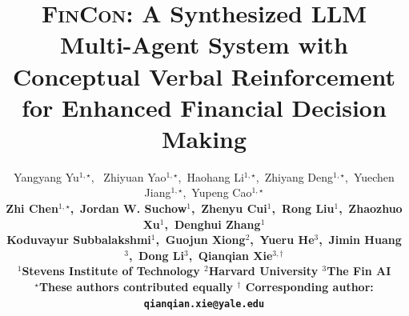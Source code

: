 \documentclass{article}
\title{\textsc{FinCon}: A Synthesized LLM Multi-Agent System with Conceptual Verbal Reinforcement for Enhanced Financial Decision Making}
\author{
\hspace{-1cm}
Yangyang Yu$^{1,\star}$, \, 
Zhiyuan Yao$^{1,\star}$,\,
Haohang Li$^{1,\star}$,\,
Zhiyang Deng$^{1,\star}$,\,
Yuechen Jiang$^{1,\star}$,\,
Yupeng Cao$^{1,\star}$\\
\bf
\hspace{-1cm}
Zhi Chen$^{1, \star}$,\,
Jordan W. Suchow$^{1}$,\,
Zhenyu Cui$^{1}$,\
Rong Liu$^{1}$,\,
Zhaozhuo Xu$^{1}$,\
Denghui Zhang$^{1}$\\
\bf
\hspace{-1cm}
Koduvayur Subbalakshmi$^{1}$,\,
\bf
Guojun Xiong$^{2}$,\,
Yueru He$^{3}$,\,
Jimin Huang $^{3}$,\,
Dong Li$^{3}$,\,
Qianqian Xie$^{3,\dagger}$\\
\hspace{-1cm}
$^{1}$Stevens Institute of Technology\quad
$^{2}$Harvard University\quad
$^{3}$The Fin AI\\
\hspace{-1cm}
$^{\star}$These authors contributed equally\quad
$^{\dagger}$ Corresponding author: \texttt{qianqian.xie@yale.edu}
}
\begin{document}
\maketitle


\begin{abstract}

\end{abstract}
\end{document}

